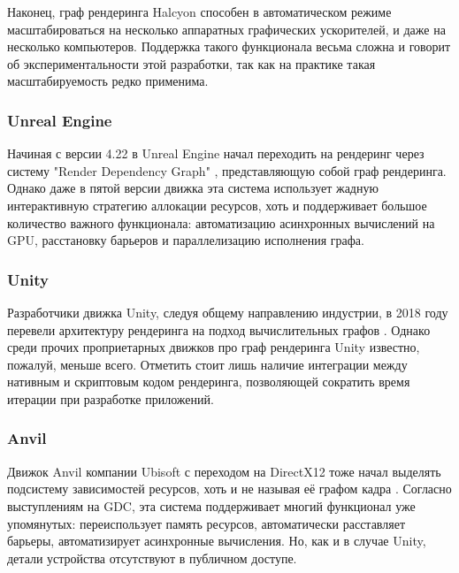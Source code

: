 Наконец, граф рендеринга Halcyon способен в автоматическом режиме масштабироваться на несколько аппаратных графических ускорителей, и даже на несколько компьютеров.
Поддержка такого функционала весьма сложна и говорит об экспериментальности этой разработки, так как на практике такая масштабируемость редко применима.

\subsubsection*{Unreal Engine}
Начиная с версии 4.22 в Unreal Engine начал переходить на рендеринг через систему "Render Dependency Graph" \cite{UERenderDependencyGraph}, представляющую собой граф рендеринга.
Однако даже в пятой версии движка эта система использует жадную интерактивную стратегию аллокации ресурсов, хоть и поддерживает большое количество важного функционала: автоматизацию асинхронных вычислений на GPU, расстановку барьеров и параллелизацию исполнения графа.

\subsubsection*{Unity}
Разработчики движка Unity, следуя общему направлению индустрии, в 2018 году перевели архитектуру рендеринга на подход вычислительных графов \cite{UnityRenderingArchitectureTalk}.
Однако среди прочих проприетарных движков про граф рендеринга Unity известно, пожалуй, меньше всего.
Отметить стоит лишь наличие интеграции между нативным и скриптовым кодом рендеринга, позволяющей сократить время итерации при разработке приложений.

\subsubsection*{Anvil}
Движок Anvil компании Ubisoft с переходом на DirectX12 тоже начал выделять подсистему зависимостей ресурсов, хоть и не называя её графом кадра \cite{DX12CaseStudies, AnvilDx12LessonsLearned}.
Согласно выступлениям на GDC, эта система поддерживает многий функционал уже упомянутых: переиспользует память ресурсов, автоматически расставляет барьеры, автоматизирует асинхронные вычисления.
Но, как и в случае Unity, детали устройства отсутствуют в публичном доступе.

